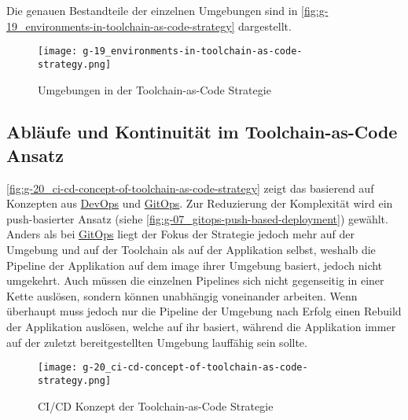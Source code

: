 Die genauen Bestandteile der einzelnen Umgebungen sind in \autoref{fig:g-19_environments-in-toolchain-as-code-strategy} dargestellt.

\begin{figure}[htp]
    \centering
    \texttt{[image: g-19\_environments-in-toolchain-as-code-strategy.png]}
    \caption{Umgebungen in der Toolchain-as-Code Strategie}
    \label{fig:g-19_environments-in-toolchain-as-code-strategy}
\end{figure}

\subsection{Abläufe und Kontinuität im Toolchain-as-Code Ansatz}
\label{subsec:05-02-03_workflows-and-continuity-in-the-toolchain-as-code-approach}

\autoref{fig:g-20_ci-cd-concept-of-toolchain-as-code-strategy} zeigt das  basierend auf Konzepten aus \hyperref[sec:03-01_devops]{DevOps} und \hyperref[sec:03-03_gitops]{GitOps}. Zur Reduzierung der Komplexität wird ein push-basierter Ansatz (siehe \autoref{fig:g-07_gitops-push-based-deployment}) gewählt. Anders als bei \hyperref[sec:03-03_gitops]{GitOps} liegt der Fokus der  Strategie jedoch mehr auf der Umgebung und auf der Toolchain als auf der Applikation selbst, weshalb die Pipeline der Applikation auf dem \Gls{image} ihrer Umgebung basiert, jedoch nicht umgekehrt. Auch müssen die einzelnen Pipelines sich nicht gegenseitig in einer Kette auslösen, sondern können unabhängig voneinander arbeiten. Wenn überhaupt muss jedoch nur die Pipeline der Umgebung nach Erfolg einen Rebuild der Applikation auslösen, welche auf ihr basiert, während die Applikation immer auf der zuletzt bereitgestellten Umgebung lauffähig sein sollte.

\begin{figure}[h]
    \centering
    \texttt{[image: g-20\_ci-cd-concept-of-toolchain-as-code-strategy.png]}
    \caption{CI/CD Konzept der Toolchain-as-Code Strategie}
    \label{fig:g-20_ci-cd-concept-of-toolchain-as-code-strategy}
\end{figure}

